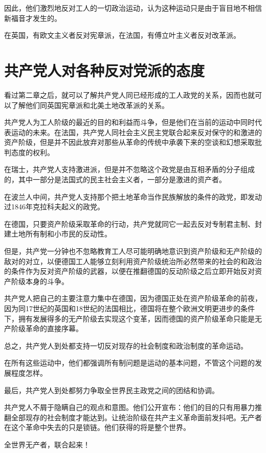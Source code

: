 \documentclass[10pt, UTF8]{book} %
\begin{document}
因此，他们激烈地反对工人的一切政治运动，认为这种运动只是由于盲目地不相信新福音才发生的。

在英国，有欧文主义者反对宪章派，在法国，有傅立叶主义者反对改革派。

\section{共产党人对各种反对党派的态度}

看过第二章之后，就可以了解共产党人同已经形成的工人政党的关系，因而也就可以了解他们同英国宪章派和北美土地改革派的关系。

共产党人为工人阶级的最近的目的和利益而斗争，但是他们在当前的运动中同时代表运动的未来。在法国，共产党人同社会主义民主党联合起来反对保守的和激进的资产阶级，但是并不因此放弃对那些从革命的传统中承袭下来的空谈和幻想采取批判态度的权利。

在瑞士，共产党人支持激进派，但是并不忽略这个政党是由互相矛盾的分子组成的，其中一部分是法国式的民主社会主义者，一部分是激进的资产者。

在波兰人中间，共产党人支持那个把土地革命当作民族解放的条件的政党，即发动过1846年克拉科夫起义的政党。

在德国，只要资产阶级采取革命的行动，共产党就同它一起去反对专制君主制、封建土地所有制和小市民的反动性。

但是，共产党一分钟也不忽略教育工人尽可能明确地意识到资产阶级和无产阶级的敌对的对立，以便德国工人能够立刻利用资产阶级统治所必然带来的社会的和政治的条件作为反对资产阶级的武器，以便在推翻德国的反动阶级之后立即开始反对资产阶级本身的斗争。

共产党人把自己的主要注意力集中在德国，因为德国正处在资产阶级革命的前夜，因为同17世纪的英国和18世纪的法国相比，德国将在整个欧洲文明更进步的条件下，拥有发展得多的无产阶级去实现这个变革，因而德国的资产阶级革命只能是无产阶级革命的直接序幕。

总之，共产党人到处都支持一切反对现存的社会制度和政治制度的革命运动。

在所有这些运动中，他们都强调所有制问题是运动的基本问题，不管这个问题的发展程度怎样。

最后，共产党人到处都努力争取全世界民主政党之间的团结和协调。

共产党人不屑于隐瞒自己的观点和意图。他们公开宣布：他们的目的只有用暴力推翻全部现存的社会制度才能达到。让统治阶级在共产主义革命面前发抖吧。无产者在这个革命中失去的只是锁链。他们获得的将是整个世界。

全世界无产者，联合起来！
\end{document}
